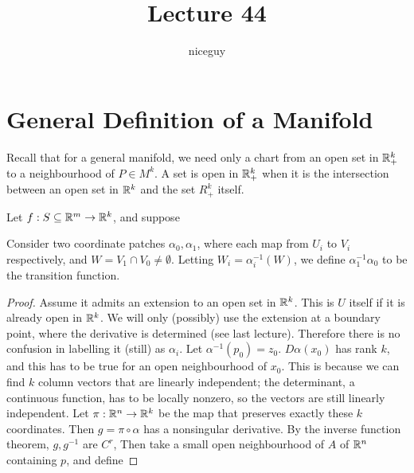 \documentclass[12pt]{article}
\title{Lecture 44}
\author{niceguy}
\begin{document}
\maketitle

\section{General Definition of a Manifold}

Recall that for a general manifold, we need only a chart from an open set in $\mathbb{R}^k_+$ to a neighbourhood of $P \in M^k$. A set is open in $\mathbb{R}^k_+$ when it is the intersection between an open set in $\mathbb{R}^k$ and the set $R^k_+$ itself.

\begin{lem}
    Let $f: S\subseteq \mathbb{R}^m \rightarrow \mathbb{R}^k$, and suppose
\end{lem}

\begin{defn}
    Consider two coordinate patches $\alpha_0, \alpha_1$, where each map from $U_i$ to $V_i$ respectively, and $W = V_1 \cap V_0 \neq \emptyset$. Letting $W_i = \alpha_i^{-1}(W)$, we define $\alpha_1^{-1}\alpha_0$ to be the transition function.
\end{defn}

\begin{proof}
    Assume it admits an extension to an open set in $\mathbb{R}^k$. This is $U$ itself if it is already open in $\mathbb{R}^k$. We will only (possibly) use the extension at a boundary point, where the derivative is determined (see last lecture). Therefore there is no confusion in labelling it (still) as $\alpha_i$. Let $\alpha^{-1}(p_0) = z_0$. $D\alpha(x_0)$ has rank $k$, and this has to be true for an open neighbourhood of $x_0$. This is because we can find $k$ column vectors that are linearly independent; the determinant, a continuous function, has to be locally nonzero, so the vectors are still linearly independent. Let $\pi: \mathbb{R}^n \rightarrow \mathbb{R}^k$ be the map that preserves exactly these $k$ coordinates. Then $g = \pi \circ \alpha$ has a nonsingular derivative. By the inverse function theorem, $g,g^{-1}$ are $C^r$, Then take a small open neighbourhood of $A$ of $\mathbb{R}^n$ containing $p$, and define
\end{proof}
\end{document}
